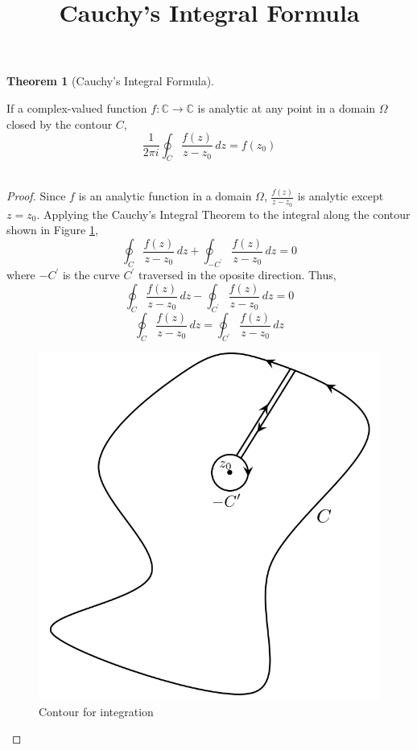 \documentclass[letterpaper, 12pt]{article}
\title{Cauchy's Integral Formula}
\date{}
\theoremstyle{custom}
\newtheorem*{theorem}{Theorem}
\begin{document}
\maketitle
\begin{theorem}[Cauchy's Integral Formula]
\end{theorem}
If a complex-valued function $f: \mathbb{C} \rightarrow \mathbb{C}$ is analytic at any point in a domain $\Omega$ closed by the contour $C$,
\begin{equation*}
  \frac{1}{2\pi i}\oint_C \frac{f(z)}{z - z_0} \, dz = f(z_0)
\end{equation*}\\

\begin{proof}
  Since $f$ is an analytic function in a domain $\Omega$, 
  $\displaystyle \frac{f(z)}{z - z_0}$ is analytic except $z = z_0$.
  Applying the Cauchy's Integral Theorem to the integral along the contour shown in Figure \ref{fig3}, 
  \begin{equation*}
    \oint_C \frac{f(z)}{z - z_0} \, dz + \oint_{-C^\prime} \frac{f(z)}{z - z_0} \, dz = 0
  \end{equation*}
  where $-C^\prime$ is the curve $C^\prime$ traversed in the oposite direction. Thus,
  \begin{equation*}
    \oint_C \frac{f(z)}{z - z_0} \, dz - \oint_{C^\prime} \frac{f(z)}{z - z_0} \, dz = 0
  \end{equation*}
  \begin{equation*}
    \oint_C \frac{f(z)}{z - z_0} \, dz = \oint_{C^\prime} \frac{f(z)}{z - z_0} \, dz
  \end{equation*}


  \begin{figure}[htbp]
    \centering
    \includegraphics[width=.5\columnwidth]{Contour3.png}
    \caption{Contour for integration}
    \label{fig3}
  \end{figure}


\end{proof}
\end{document}
